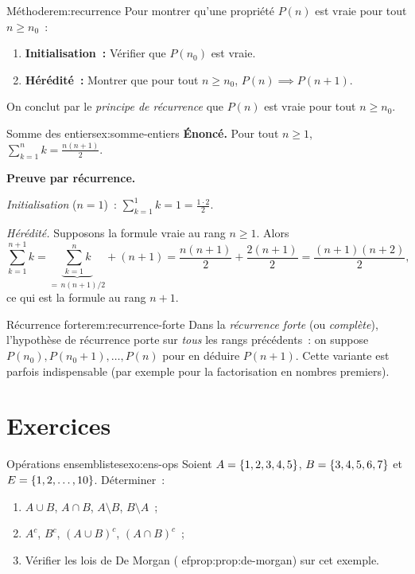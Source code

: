 \begin{remark}{Méthode}{rem:recurrence}
  Pour montrer qu'une propriété $P(n)$ est vraie pour tout $n\geq n_0$~:
  \begin{enumerate}[label=\textbf{(\arabic*)}]
    \item \textbf{Initialisation~:} Vérifier que $P(n_0)$ est vraie.
    \item \textbf{Hérédité~:} Montrer que pour tout $n\geq n_0$,
      $P(n)\implies P(n+1)$.
  \end{enumerate}
  On conclut par le \emph{principe de récurrence} que $P(n)$ est vraie
  pour tout $n\geq n_0$.
\end{remark}

\begin{example}{Somme des entiers}{ex:somme-entiers}
  \textbf{Énoncé.} Pour tout $n\geq 1$,\; $\displaystyle\sum_{k=1}^{n}k=\frac{n(n+1)}{2}$.

  \textbf{Preuve par récurrence.}

  \emph{Initialisation} ($n=1$)~: $\sum_{k=1}^{1}k=1=\frac{1\cdot 2}{2}$. \checkmark

  \emph{Hérédité.} Supposons la formule vraie au rang $n\geq 1$.
  Alors
  \[
    \sum_{k=1}^{n+1}k = \underbrace{\sum_{k=1}^{n}k}_{=\,n(n+1)/2} + (n+1)
    = \frac{n(n+1)}{2}+\frac{2(n+1)}{2}
    = \frac{(n+1)(n+2)}{2},
  \]
  ce qui est la formule au rang $n+1$.
\end{example}

\begin{remark}{Récurrence forte}{rem:recurrence-forte}
  Dans la \emph{récurrence forte} (ou \emph{complète}), l'hypothèse de
  récurrence porte sur \emph{tous} les rangs précédents~: on suppose
  $P(n_0),P(n_0+1),\ldots,P(n)$ pour en déduire $P(n+1)$. Cette
  variante est parfois indispensable (par exemple pour la factorisation
  en nombres premiers).
\end{remark}

\section{Exercices}\label{sec:exo-ch0}

\begin{exercise}{\basic{} Opérations ensemblistes}{exo:ens-ops}
  Soient $A=\left\{1,2,3,4,5\right\}$, $B=\left\{3,4,5,6,7\right\}$ et
  $E=\left\{1,2,\ldots,10\right\}$. Déterminer~:
  \begin{enumerate}[label=(\alph*)]
    \item $A\cup B$, $A\cap B$, $A\setminus B$, $B\setminus A$~;
    \item $A^c$, $B^c$, $(A\cup B)^c$, $(A\cap B)^c$~;
    \item Vérifier les lois de De Morgan (
ef{prop:prop:de-morgan}) sur cet
      exemple.
  \end{enumerate}
\end{exercise}

